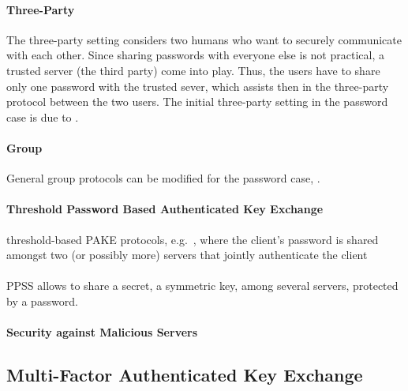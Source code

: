 \paragraph{Three-Party }
The three-party setting considers two humans who want to securely communicate with each other.
Since sharing passwords with everyone else is not practical, a trusted server (the third party) come into play.
Thus, the users have to share only one password with the trusted sever, which assists then in the three-party protocol between the two users.
The initial three-party setting in the password case is due to \citeauthor{Abdalla2005} \cite{Abdalla2005}.

\paragraph{Group }
General group protocols can be modified for the password case, \eg \cite{Bresson02,BrChPo05}.

\paragraph{Threshold Password Based Authenticated Key Exchange}
threshold-based PAKE protocols, e.g.~\cite{Abdalla2005b}, where the client's password is shared amongst two (or possibly more) servers that jointly authenticate the client

\paragraph{}
\ac{PPSS} allows to share a secret, \eg a symmetric key, among several servers, protected by a password. \cite{Bagherzandi2011}

\paragraph{Security against Malicious Servers}

\subsection{Multi-Factor Authenticated Key Exchange}

